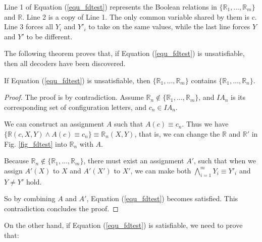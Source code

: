 \documentclass[journal]{IEEEtran}
\begin{document}
Line 1 of Equation (\ref{equ_fdtest}) represents the Boolean relations in $\{\mathbb{R}_1,\dots,\mathbb{R}_{m}\}$ and $\mathbb{R}$.
Line 2 is a copy of Line 1.
The only common variable shared by them is $c$.
Line 3 forces all $Y_i$ and $Y'_i$ to take on the same values,
while the last line forces $Y$ and $Y'$ to be different.

The following theorem proves that,
if Equation (\ref{equ_fdtest}) is unsatisfiable,
then all decoders have been discovered.

\begin{theorem}\label{thm_fdok}
If Equation (\ref{equ_fdtest}) is unsatisfiable,
then $\{\mathbb{R}_1,\dots,\mathbb{R}_{m}\}$ contains $\{\mathbb{R}_1,\dots,\mathbb{R}_{n}\}$.
\end{theorem}
\begin{proof}
The proof is by contradiction.
Assume $\mathbb{R}_n\notin \{\mathbb{R}_1,\dots,\mathbb{R}_m\}$,
and $IA_n$ is its corresponding set of configuration letters,
and $c_n\in IA_n$.

We can construct an assignment $A$ such that $A(c)\equiv c_n$.
Thus we have $\{\mathbb{R}(c,X,Y)\wedge A(c)\equiv c_n\} \equiv \mathbb{R}_n(X,Y)$,
that is,
we can change the $\mathbb{R}$ and $\mathbb{R}'$ in Fig. \ref{fig_fdtest} into $\mathbb{R}_n$ with $A$.

Because $\mathbb{R}_n\notin \{\mathbb{R}_1,\dots,\mathbb{R}_m\}$,
there must exist an assignment $A'$,
such that when we assign $A'(X)$ to $X$ and $A'(X')$ to $X'$,
we can make both $\bigwedge_{i=1}^{m}Y_i\equiv Y'_i$ and $Y\ne Y'$ hold.

So by combining $A$ and $A'$,
Equation (\ref{equ_fdtest}) becomes satisfied.
This contradiction concludes the proof.
\end{proof}



On the other hand,
if Equation (\ref{equ_fdtest}) is satisfiable,
we need to prove that:
\end{document}
